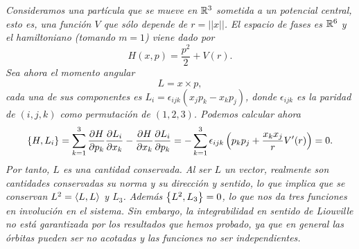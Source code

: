 \begin{ejemplo}
  \em
  Consideramos una partícula que se mueve en $\mathbb{R}^3$ sometida a un potencial central, esto es, una función $V$ que sólo depende de $r=||x||$. El espacio de fases es $\mathbb{R}^6$ y el hamiltoniano (tomando $m=1$) viene dado por
  \begin{equation*}
    H(x,p)=\frac{p^2}{2}+V(r).   
  \end{equation*}
  Sea ahora el momento angular
  \begin{equation*}
    L=x \times p,
  \end{equation*}
  cada una de sus componentes es $L_i=\epsilon_{ijk}(x_jp_k-x_kp_j)$, donde $\epsilon_{ijk}$ es la paridad de $(i,j,k)$ como permutación de $(1,2,3)$. Podemos calcular ahora 
  \begin{equation*}
    \left\lbrace H,L_i\right\rbrace= \sum_{k=1}^3 \frac{\partial H}{\partial p_k} \frac{\partial L_i}{\partial x_k} - \frac{\partial H}{\partial x_k} \frac{\partial L_i}{\partial p_k}= -\sum_{k=1}^3 \epsilon_{ijk}\left( p_kp_j + \frac{x_kx_j}{r}V'(r) \right)=0.
  \end{equation*}
  Por tanto, $L$ es una cantidad conservada. Al ser $L$ un vector, realmente son cantidades conservadas su norma y su dirección y sentido, lo que implica que se conservan $L^2=\left\langle L,L\right\rangle$ y $L_3$. Además $\left\lbrace L^2,L_3\right\rbrace=0$, lo que nos da tres funciones en involución en el sistema.
  Sin embargo, la integrabilidad en sentido de Liouville no está garantizada por los resultados que hemos probado, ya que en general las órbitas pueden ser no acotadas y las funciones no ser independientes. 
\end{ejemplo}

